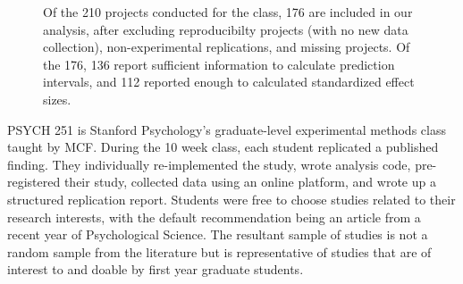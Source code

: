\documentclass[
  english,
  a4paper,
]{article}
\begin{document}
\begin{figure}[ht]
    
\caption{Of the 210 projects conducted for the class, 176 are included in our analysis, after excluding reproducibilty projects (with no new data collection), non-experimental replications, and missing projects. Of the 176, 136 report sufficient information to calculate prediction intervals, and 112 reported enough to calculated standardized effect sizes. }\label{fig:prisma}
\end{figure}

PSYCH 251 is Stanford Psychology's graduate-level experimental methods class taught by MCF. During the 10 week class, each student replicated a published finding. They individually re-implemented the study, wrote analysis code, pre-registered their study, collected data using an online platform, and wrote up a structured replication report. Students were free to choose studies related to their research interests, with the default recommendation being an article from a recent year of Psychological Science. The resultant sample of studies is not a random sample from the literature but is representative of studies that are of interest to and doable by first year graduate students.
\end{document}
